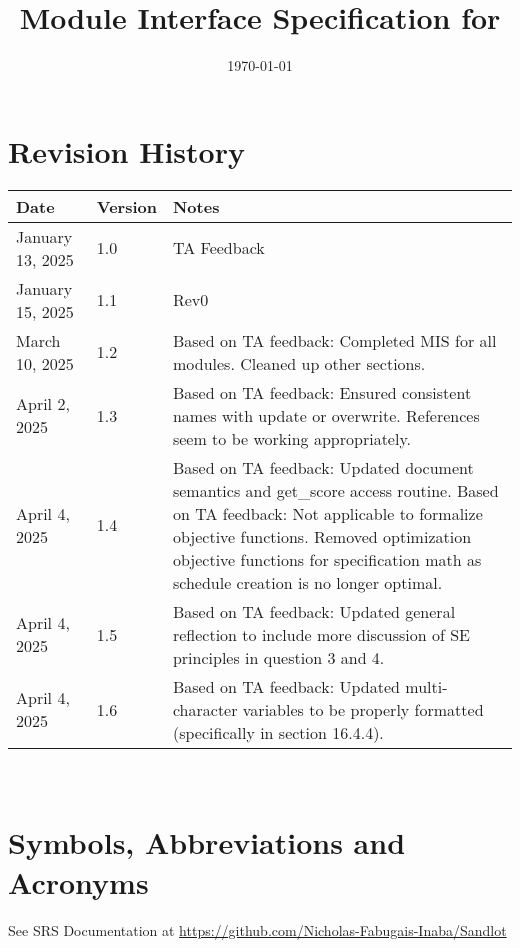 \documentclass[12pt, titlepage]{article}
\begin{document}
\title{Module Interface Specification for \progname{}}

\author{\authname}

\date{\today}

\maketitle


\section{Revision History}

\begin{tabularx}{\textwidth}{p{3cm}p{2cm}X}
\toprule {\bf Date} & {\bf Version} & {\bf Notes}\\
\midrule
January 13, 2025 & 1.0 & TA Feedback\\
January 15, 2025 & 1.1 & Rev0\\
March 10, 2025 & 1.2 & Based on TA feedback: Completed MIS for all modules. Cleaned up other sections.\\
April 2, 2025 & 1.3 & Based on TA feedback: Ensured consistent names with
update or overwrite. References seem to be working appropriately.\\
April 4, 2025 & 1.4 & Based on TA feedback: Updated document semantics and
get\_score access routine. Based on TA feedback: Not applicable to formalize objective functions. Removed 
optimization objective functions for specification math as schedule creation is no longer optimal.\\
April 4, 2025 & 1.5 & Based on TA feedback: Updated general reflection to include more discussion of SE principles in question 3 and 4. \\
April 4, 2025 & 1.6 & Based on TA feedback: Updated multi-character variables to be properly formatted (specifically in section 16.4.4). \\
\bottomrule
\end{tabularx}

~\newpage

\section{Symbols, Abbreviations and Acronyms}

See SRS Documentation at \url{https://github.com/Nicholas-Fabugais-Inaba/Sandlot}

\newpage
\end{document}
